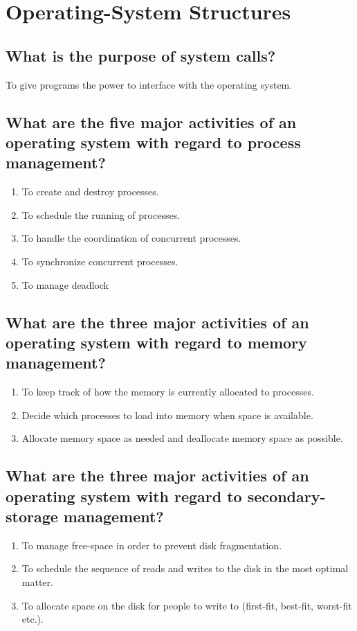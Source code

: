 \documentclass{book}%
\begin{document}
\chapter{Operating-System Structures}
\section{What is the purpose of system calls?}
To give programs the power to interface with the operating system.
\section{What are the five major activities of an operating system with regard 
to process management?}
\begin{enumerate}
\item To create and destroy processes.
\item To schedule the running of processes. 
\item To handle the coordination of concurrent processes.
\item To synchronize concurrent processes.
\item To manage deadlock %
\end{enumerate}
\section{What are the three major activities of an operating system with regard 
to memory management?}%
\begin{enumerate}
\item To keep track of how the memory is currently allocated to processes.
\item Decide which processes to load into memory when space is available.
\item Allocate memory space as needed and deallocate memory space as possible.
\end{enumerate}
\section{What are the three major activities of an operating system with regard 
to secondary-storage management?}%
\begin{enumerate}
\item To manage free-space in order to prevent disk fragmentation.
\item To schedule the sequence of reads and writes to the disk in the most 
optimal matter.
\item To allocate space on the disk for people to write to (first-fit, best-fit,
worst-fit etc.).
\end{enumerate}
\end{document}
